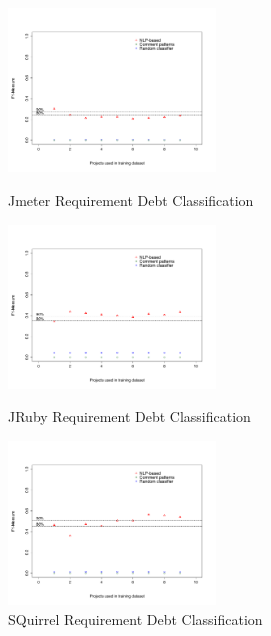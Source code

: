 \begin{figure}[thb!]
  \centering
  \includegraphics[width=0.49\textwidth]{figures/appendix/iteration_details/implementation_jmeter.pdf}
  \caption{Jmeter Requirement Debt Classification}
  \label{fig:implementation_jmeter}
  \includegraphics[width=0.49\textwidth]{figures/appendix/iteration_details/implementation_jruby.pdf}
  \caption{JRuby Requirement Debt Classification}
  \label{fig:implementation_jruby}
  \includegraphics[width=0.49\textwidth]{figures/appendix/iteration_details/implementation_sql12.pdf}
  \caption{SQuirrel Requirement Debt Classification}
  \label{fig:implementation_sql}    
\end{figure}


